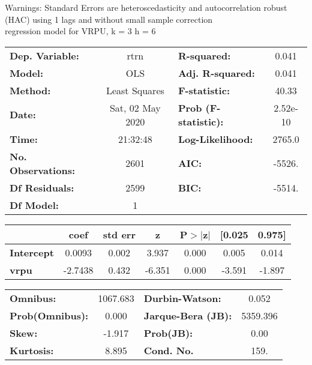 Warnings: \newline
 [1] Standard Errors are heteroscedasticity and autocorrelation robust (HAC) using 1 lags and without small sample correction\\ 

regression model for VRPU, k = 3 h = 6\begin{center}
\begin{tabular}{lclc}
\toprule
\textbf{Dep. Variable:}    &       rtrn       & \textbf{  R-squared:         } &     0.041   \\
\textbf{Model:}            &       OLS        & \textbf{  Adj. R-squared:    } &     0.041   \\
\textbf{Method:}           &  Least Squares   & \textbf{  F-statistic:       } &     40.33   \\
\textbf{Date:}             & Sat, 02 May 2020 & \textbf{  Prob (F-statistic):} &  2.52e-10   \\
\textbf{Time:}             &     21:32:48     & \textbf{  Log-Likelihood:    } &    2765.0   \\
\textbf{No. Observations:} &        2601      & \textbf{  AIC:               } &    -5526.   \\
\textbf{Df Residuals:}     &        2599      & \textbf{  BIC:               } &    -5514.   \\
\textbf{Df Model:}         &           1      & \textbf{                     } &             \\
\bottomrule
\end{tabular}
\begin{tabular}{lcccccc}
                   & \textbf{coef} & \textbf{std err} & \textbf{z} & \textbf{P$> |$z$|$} & \textbf{[0.025} & \textbf{0.975]}  \\
\midrule
\textbf{Intercept} &       0.0093  &        0.002     &     3.937  &         0.000        &        0.005    &        0.014     \\
\textbf{vrpu}      &      -2.7438  &        0.432     &    -6.351  &         0.000        &       -3.591    &       -1.897     \\
\bottomrule
\end{tabular}
\begin{tabular}{lclc}
\textbf{Omnibus:}       & 1067.683 & \textbf{  Durbin-Watson:     } &    0.052  \\
\textbf{Prob(Omnibus):} &   0.000  & \textbf{  Jarque-Bera (JB):  } & 5359.396  \\
\textbf{Skew:}          &  -1.917  & \textbf{  Prob(JB):          } &     0.00  \\
\textbf{Kurtosis:}      &   8.895  & \textbf{  Cond. No.          } &     159.  \\
\bottomrule
\end{tabular}
\end{center}

